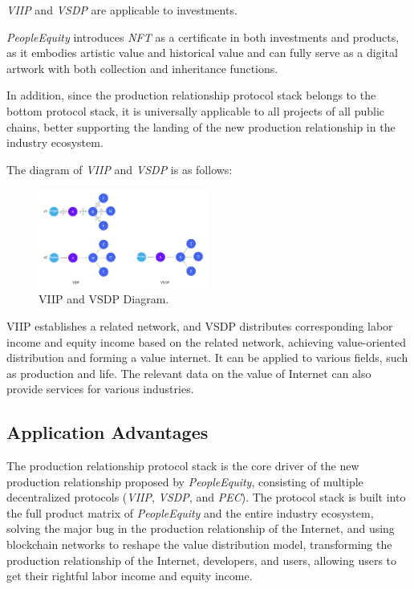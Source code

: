 \documentclass{article}
\begin{document}
\emph{VIIP} and \emph{VSDP} are applicable to investments. 

\emph{PeopleEquity} introduces \emph{NFT} as a certificate in both investments and products, as it embodies artistic value and historical value and can fully serve as a digital artwork with both collection and inheritance functions.

In addition, since the production relationship protocol stack belongs to the bottom protocol stack, it is universally applicable to all projects of all public chains, better supporting the landing of the new production relationship in the industry ecosystem.

The diagram of \emph{VIIP} and \emph{VSDP} is as follows:

\begin{figure}
\centering
\includegraphics[width=0.5\textwidth]{./img/viip_vsdp_diagram.png}
\caption{\label{fig}VIIP and VSDP Diagram.}
\end{figure}

VIIP establishes a related network, and VSDP distributes corresponding labor income and equity income based on the related network, achieving value-oriented distribution and forming a value internet. It can be applied to various fields, such as production and life. The relevant data on the value of Internet can also provide services for various industries.

\subsection{Application Advantages}

The production relationship protocol stack is the core driver of the new production relationship proposed by \emph{PeopleEquity}, consisting of multiple decentralized protocols (\emph{VIIP}, \emph{VSDP}, and \emph{PEC}). The protocol stack is built into the full product matrix of \emph{PeopleEquity} and the entire industry ecosystem, solving the major bug in the production relationship of the Internet, and using blockchain networks to reshape the value distribution model, transforming the production relationship of the Internet, developers, and users, allowing users to get their rightful labor income and equity income.
\end{document}
